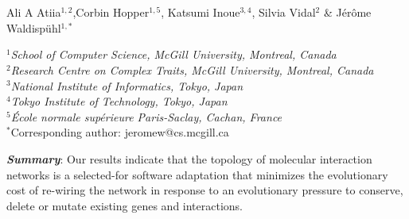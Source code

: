 


{}~\\~\\
\date{}

{\noindent\normalsize{\centering Ali A Atiia{\footnotesize$^{1,2}$},Corbin Hopper{\footnotesize$^{1,5}$}, Katsumi Inoue{\footnotesize$^{3,4}$}, Silvia Vidal{\footnotesize$^{2}$} \&  Jérôme Waldispühl{\footnotesize$^{1,*}$}}}

{\footnotesize
   \noindent$^1$\textit{School of Computer Science, McGill University, Montreal, Canada}~\\
   \noindent$^2$\textit{Research Centre on Complex Traits, McGill University, Montreal, Canada}~\\
   \noindent$^3$\textit{National Institute of Informatics, Tokyo, Japan}~\\
   \noindent$^4$\textit{Tokyo Institute of Technology, Tokyo, Japan}~\\
   \noindent$^5$\textit{École normale supérieure Paris-Saclay, Cachan, France}~\\
   \noindent$^*${Corresponding author: jeromew@cs.mcgill.ca}~\\
}


\vspace{25pt}
  {\noindent\textit{\textbf{Summary}}: Our results indicate that the topology of molecular interaction networks is a selected-for software adaptation that minimizes the evolutionary cost of re-wiring the network in response to an evolutionary pressure to conserve, delete or mutate existing genes and interactions.}
\vspace{33pt}

